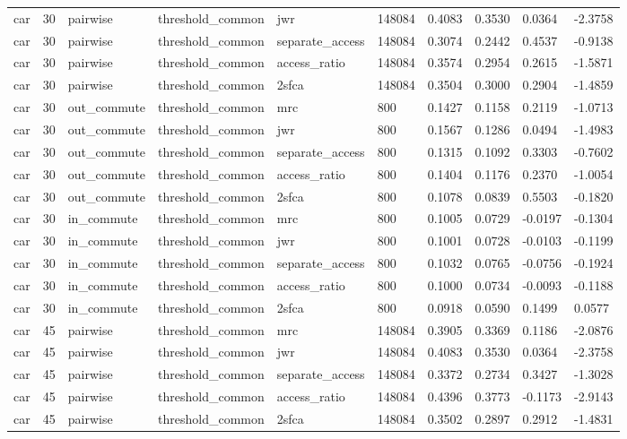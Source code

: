\begin{table}[htbp]
\begin{tabular}{llllllllll}
car & 30 & pairwise & threshold\_common & jwr & 148084 & 0.4083 & 0.3530 & 0.0364 & -2.3758 \\
car & 30 & pairwise & threshold\_common & separate\_access & 148084 & 0.3074 & 0.2442 & 0.4537 & -0.9138 \\
car & 30 & pairwise & threshold\_common & access\_ratio & 148084 & 0.3574 & 0.2954 & 0.2615 & -1.5871 \\
car & 30 & pairwise & threshold\_common & 2sfca & 148084 & 0.3504 & 0.3000 & 0.2904 & -1.4859 \\
car & 30 & out\_commute & threshold\_common & mrc & 800 & 0.1427 & 0.1158 & 0.2119 & -1.0713 \\
car & 30 & out\_commute & threshold\_common & jwr & 800 & 0.1567 & 0.1286 & 0.0494 & -1.4983 \\
car & 30 & out\_commute & threshold\_common & separate\_access & 800 & 0.1315 & 0.1092 & 0.3303 & -0.7602 \\
car & 30 & out\_commute & threshold\_common & access\_ratio & 800 & 0.1404 & 0.1176 & 0.2370 & -1.0054 \\
car & 30 & out\_commute & threshold\_common & 2sfca & 800 & 0.1078 & 0.0839 & 0.5503 & -0.1820 \\
car & 30 & in\_commute & threshold\_common & mrc & 800 & 0.1005 & 0.0729 & -0.0197 & -0.1304 \\
car & 30 & in\_commute & threshold\_common & jwr & 800 & 0.1001 & 0.0728 & -0.0103 & -0.1199 \\
car & 30 & in\_commute & threshold\_common & separate\_access & 800 & 0.1032 & 0.0765 & -0.0756 & -0.1924 \\
car & 30 & in\_commute & threshold\_common & access\_ratio & 800 & 0.1000 & 0.0734 & -0.0093 & -0.1188 \\
car & 30 & in\_commute & threshold\_common & 2sfca & 800 & 0.0918 & 0.0590 & 0.1499 & 0.0577 \\
car & 45 & pairwise & threshold\_common & mrc & 148084 & 0.3905 & 0.3369 & 0.1186 & -2.0876 \\
car & 45 & pairwise & threshold\_common & jwr & 148084 & 0.4083 & 0.3530 & 0.0364 & -2.3758 \\
car & 45 & pairwise & threshold\_common & separate\_access & 148084 & 0.3372 & 0.2734 & 0.3427 & -1.3028 \\
car & 45 & pairwise & threshold\_common & access\_ratio & 148084 & 0.4396 & 0.3773 & -0.1173 & -2.9143 \\
car & 45 & pairwise & threshold\_common & 2sfca & 148084 & 0.3502 & 0.2897 & 0.2912 & -1.4831 \\

\end{tabular}
\end{table}
